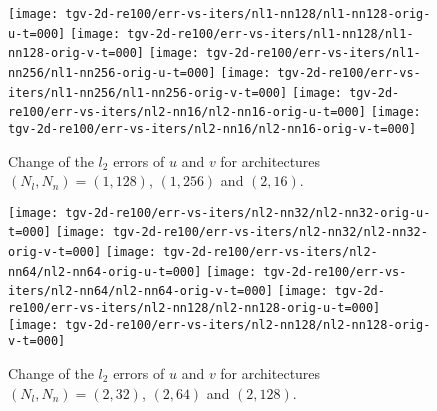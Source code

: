 \begin{figure}[H]
    \centering
    \texttt{[image: tgv-2d-re100/err-vs-iters/nl1-nn128/nl1-nn128-orig-u-t=000]}%
    \hfill%
    \texttt{[image: tgv-2d-re100/err-vs-iters/nl1-nn128/nl1-nn128-orig-v-t=000]}%
    \newline
    \vfill
    \texttt{[image: tgv-2d-re100/err-vs-iters/nl1-nn256/nl1-nn256-orig-u-t=000]}%
    \hfill
    \texttt{[image: tgv-2d-re100/err-vs-iters/nl1-nn256/nl1-nn256-orig-v-t=000]}%
    \newline
    \vfill
    \texttt{[image: tgv-2d-re100/err-vs-iters/nl2-nn16/nl2-nn16-orig-u-t=000]}%
    \hfill
    \texttt{[image: tgv-2d-re100/err-vs-iters/nl2-nn16/nl2-nn16-orig-v-t=000]}%
    \caption{Change of the $l_2$ errors of $u$ and $v$ for architectures $(N_l, N_n)=(1, 128)$, $(1, 256)$ and $(2, 16)$.}
\end{figure}

\begin{figure}[H]
    \centering
    \texttt{[image: tgv-2d-re100/err-vs-iters/nl2-nn32/nl2-nn32-orig-u-t=000]}%
    \hfill%
    \texttt{[image: tgv-2d-re100/err-vs-iters/nl2-nn32/nl2-nn32-orig-v-t=000]}%
    \newline
    \vfill
    \texttt{[image: tgv-2d-re100/err-vs-iters/nl2-nn64/nl2-nn64-orig-u-t=000]}%
    \hfill
    \texttt{[image: tgv-2d-re100/err-vs-iters/nl2-nn64/nl2-nn64-orig-v-t=000]}%
    \newline
    \vfill
    \texttt{[image: tgv-2d-re100/err-vs-iters/nl2-nn128/nl2-nn128-orig-u-t=000]}%
    \hfill
    \texttt{[image: tgv-2d-re100/err-vs-iters/nl2-nn128/nl2-nn128-orig-v-t=000]}%
    \caption{Change of the $l_2$ errors of $u$ and $v$ for architectures $(N_l, N_n)=(2, 32)$, $(2, 64)$ and $(2, 128)$.}
\end{figure}

